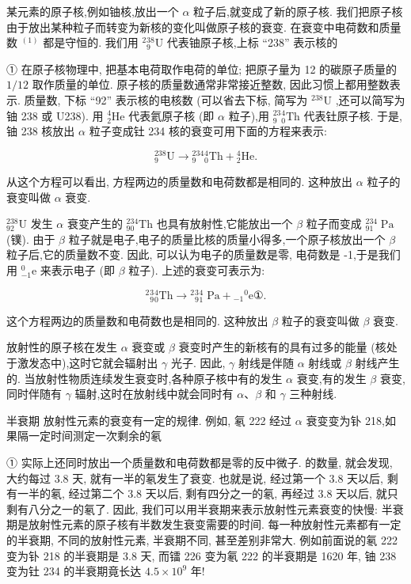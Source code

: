 \documentclass[10pt]{article}
\begin{document}
某元素的原子核,例如铀核,放出一个 \(\alpha\) 粒子后,就变成了新的原子核. 我们把原子核由于放出某种粒子而转变为新核的变化叫做原子核的衰变. 在衰变中电荷数和质量数 \({}^{\left( 1\right) }\) 都是守恒的. 我们用 \({}^{2}{}_{9}^{38}\mathrm{U}\) 代表铀原子核,上标 “238” 表示核的

① 在原子核物理中, 把基本电荷取作电荷的单位; 把原子量为 12 的碳原子质量的 \(1/{12}\) 取作质量的单位. 原子核的质量数通常非常接近整数, 因此习惯上都用整数表示. 质量数, 下标 “92” 表示核的电核数 (可以省去下标, 简写为 \({}^{238}\mathrm{U}\) ,还可以简写为铀 238 或 U238). 用 \({}_{2}^{4}\mathrm{{He}}\) 代表氦原子核 (即 \(\alpha\) 粒子),用 \({}_{9}^{23}{}_{0}^{4}\mathrm{{Th}}\) 代表钍原子核. 于是,铀 238 核放出 \(\alpha\) 粒子变成钍 234 核的衰变可用下面的方程来表示:

\[
{}_{9}^{238}\mathrm{U} \rightarrow {}_{9}^{234}{}_{0}^{4}\mathrm{{Th}} + {}_{2}^{4}\mathrm{{He}}.
\]

从这个方程可以看出, 方程两边的质量数和电荷数都是相同的. 这种放出 \(\alpha\) 粒子的衰变叫做 \(\alpha\) 衰变.

\({}_{92}^{238}\mathrm{U}\) 发生 \(\alpha\) 衰变产生的 \({}_{90}^{234}\mathrm{{Th}}\) 也具有放射性,它能放出一个 \(\beta\) 粒子而变成 \({}_{91}^{234}\mathrm{\;{Pa}}\) (镤). 由于 \(\beta\) 粒子就是电子,电子的质量比核的质量小得多,一个原子核放出一个 \(\beta\) 粒子后,它的质量数不变. 因此, 可以认为电子的质量数是零, 电荷数是 -1,于是我们用 \({}_{-1}^{0}\mathrm{e}\) 来表示电子 (即 \(\beta\) 粒子). 上述的衰变可表示为:

\[
{}^{2}{}_{9}^{3}{}_{0}^{4}\mathrm{{Th}} \rightarrow {}^{2}{}_{9}^{3}{}_{1}^{4}\mathrm{\;{Pa}} + {}_{-1}{}^{0}\mathrm{e}\text{①.}
\]

这个方程两边的质量数和电荷数也是相同的. 这种放出 \(\beta\) 粒子的衰变叫做 \(\beta\) 衰变.

放射性的原子核在发生 \(\alpha\) 衰变或 \(\beta\) 衰变时产生的新核有的具有过多的能量 (核处于激发态中),这时它就会辐射出 \(\gamma\) 光子. 因此, \(\gamma\) 射线是伴随 \(\alpha\) 射线或 \(\beta\) 射线产生的. 当放射性物质连续发生衰变时,各种原子核中有的发生 \(\alpha\) 衰变,有的发生 \(\beta\) 衰变,同时伴随有 \(\gamma\) 辐射,这时在放射线中就会同时有 \(\alpha \text{、}\beta\) 和 \(\gamma\) 三种射线.

半衰期 放射性元素的衰变有一定的规律. 例如, 氡 222 经过 \(\alpha\) 衰变变为钋 218,如果隔一定时间测定一次剩余的氡

① 实际上还同时放出一个质量数和电荷数都是零的反中微子. 的数量, 就会发现, 大约每过 3.8 天, 就有一半的氡发生了衰变. 也就是说, 经过第一个 3.8 天以后, 剩有一半的氡, 经过第二个 3.8 天以后, 剩有四分之一的氡, 再经过 3.8 天以后, 就只剩有八分之一的氡了. 因此, 我们可以用半衰期来表示放射性元素衰变的快慢: 半衰期是放射性元素的原子核有半数发生衰变需要的时间. 每一种放射性元素都有一定的半衰期, 不同的放射性元素, 半衰期不同, 甚至差别非常大. 例如前面说的氡 222 变为钋 218 的半衰期是 3.8 天, 而镭 226 变为氡 222 的半衰期是 1620 年, 铀 238 变为钍 234 的半衰期竟长达 \({4.5} \times {10}^{9}\) 年!
\end{document}
